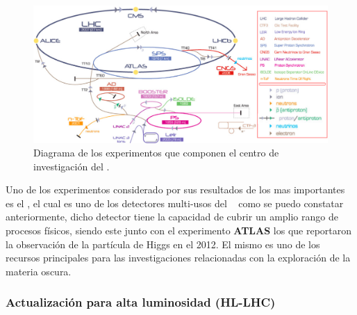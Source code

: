 \begin{figure}[h!]
\centering
\includegraphics[width=.9\textwidth]{Cap2/imagenes/cern.png}
\caption[Diagrama de los experimentos que componen el centro de investigación del \CERN.]{Diagrama de los experimentos que componen el centro de investigación del \CERN.\footnotemark}
    \label{cern}
\end{figure}

Uno de los experimentos considerado por sus resultados de los mas importantes es el \CMS, el cual es uno de los detectores multi-usos del \CERN ~ como se puedo constatar anteriormente, dicho detector tiene la capacidad de cubrir un amplio rango de procesos físicos, siendo este junto con el experimento \textbf{ATLAS} los que reportaron la observación de la partícula de Higgs en el 2012. El mismo es uno de los recursos principales para las investigaciones relacionadas con la exploración de la materia oscura.

\subsubsection{Actualizaci\'on para alta luminosidad (HL-LHC)}


